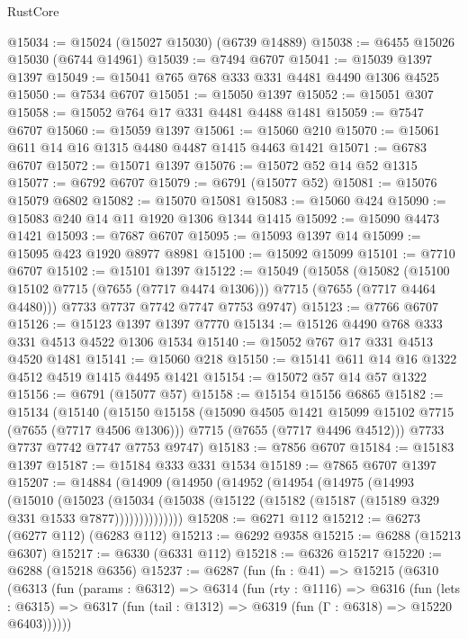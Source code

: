 \begin{lexlean}{RustCore}
\begin{coremodule}
@15034 := @15024 (@15027 @15030) (@6739 @14889)
@15038 := @6455 @15026 @15030 (@6744 @14961)
@15039 := @7494 @6707
@15041 := @15039 @1397 @1397
@15049 := @15041 @765 @768 @333 @331 @4481 @4490 @1306 @4525
@15050 := @7534 @6707
@15051 := @15050 @1397
@15052 := @15051 @307
@15058 := @15052 @764 @17 @331 @4481 @4488 @1481
@15059 := @7547 @6707
@15060 := @15059 @1397
@15061 := @15060 @210
@15070 := @15061 @611 @14 @16 @1315 @4480 @4487 @1415 @4463 @1421
@15071 := @6783 @6707
@15072 := @15071 @1397
@15076 := @15072 @52 @14 @52 @1315
@15077 := @6792 @6707
@15079 := @6791 (@15077 @52)
@15081 := @15076 @15079 @6802
@15082 := @15070 @15081
@15083 := @15060 @424
@15090 := @15083 @240 @14 @11 @1920 @1306 @1344 @1415
@15092 := @15090 @4473 @1421
@15093 := @7687 @6707
@15095 := @15093 @1397 @14
@15099 := @15095 @423 @1920 @8977 @8981
@15100 := @15092 @15099
@15101 := @7710 @6707
@15102 := @15101 @1397
@15122 := @15049
    (@15058
      (@15082 (@15100 @15102 @7715 (@7655 (@7717 @4474 @1306))) @7715 (@7655 (@7717 @4464 @4480)))
      @7733
      @7737
      @7742
      @7747
      @7753
      @9747)
@15123 := @7766 @6707
@15126 := @15123 @1397 @1397 @7770
@15134 := @15126 @4490 @768 @333 @331 @4513 @4522 @1306 @1534
@15140 := @15052 @767 @17 @331 @4513 @4520 @1481
@15141 := @15060 @218
@15150 := @15141 @611 @14 @16 @1322 @4512 @4519 @1415 @4495 @1421
@15154 := @15072 @57 @14 @57 @1322
@15156 := @6791 (@15077 @57)
@15158 := @15154 @15156 @6865
@15182 := @15134
    (@15140
      (@15150
        @15158
        (@15090 @4505 @1421 @15099 @15102 @7715 (@7655 (@7717 @4506 @1306)))
        @7715
        (@7655 (@7717 @4496 @4512)))
      @7733
      @7737
      @7742
      @7747
      @7753
      @9747)
@15183 := @7856 @6707
@15184 := @15183 @1397
@15187 := @15184 @333 @331 @1534
@15189 := @7865 @6707 @1397
@15207 := @14884
    (@14909
      (@14950
        (@14952
          (@14954
            (@14975
              (@14993
                (@15010
                  (@15023
                    (@15034
                      (@15038 (@15122 (@15182 (@15187 (@15189 @329 @331 @1533 @7877))))))))))))))
@15208 := @6271 @112
@15212 := @6273 (@6277 @112) (@6283 @112)
@15213 := @6292 @9358
@15215 := @6288 (@15213 @6307)
@15217 := @6330 (@6331 @112)
@15218 := @6326 @15217
@15220 := @6288 (@15218 @6356)
@15237 := @6287
    (fun (fn : @41) =>
    @15215
      (@6310
        (@6313
          (fun (params : @6312) =>
          @6314
            (fun (rty : @1116) =>
            @6316
              (fun (lets : @6315) =>
              @6317 (fun (tail : @1312) => @6319 (fun (Γ : @6318) => @15220 @6403))))))

\end{coremodule}
\end{lexlean}
